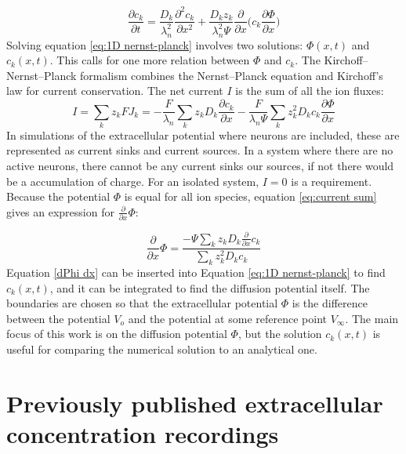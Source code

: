 \documentclass{uiophd}
\begin{document}
\begin{equation}\label{eq:1D nernst-planck}
\frac{\partial c_k}{\partial t}= \frac{D_k}{\lambda_n^2} \frac{\partial^2 c_k}{\partial x^2}+\frac{D_k z_k}{\lambda_n^2 \Psi} \frac{\partial }{\partial x}  \bigg(c_k \frac{\partial \Phi}{\partial x} \bigg)
\end{equation}
Solving equation \ref{eq:1D nernst-planck} involves two solutions: $\Phi (x,t)$ and $c_k(x,t)$. This calls for one more relation between $\Phi$ and $c_k$. The Kirchoff--Nernst--Planck formalism \cite{Halnes2015} \cite{Halnes2016} combines the Nernst--Planck equation and Kirchoff's law for current conservation. 
The net current $I$ is the sum of all the ion fluxes:
\begin{equation}\label{eq:current sum}
I = \sum_{k}z_k FJ_k = -\frac{F}{\lambda_n}\sum_k z_k D_k  \frac{\partial c_k}{ \partial x} - \frac{F}{\lambda_n \Psi}\sum_k z_k^2D_k c_k \frac{\partial \Phi}{\partial x}
\end{equation}
In simulations of the extracellular potential where neurons are included, these are represented as current sinks and current sources. In a system where there are no active neurons, there cannot be any current sinks our sources, if not there would be a accumulation of charge. For an isolated system, $I=0$ is a requirement. Because the potential 
$\Phi$ is equal for all ion species, equation \ref{eq:current sum} gives an  expression for $ \frac{\partial}{\partial x} \Phi$:

\begin{equation}\label{dPhi dx}
\frac{\partial}{\partial x} \Phi = \frac{-\Psi \sum_k z_k D_k \frac{\partial}{\partial x} c_k}{\sum_k z_k^2 D_k c_k}
\end{equation}
Equation \ref{dPhi dx} can be inserted into Equation \ref{eq:1D nernst-planck} to find $c_k(x,t)$, and it can be integrated to find the diffusion potential itself. The boundaries are chosen so that the extracellular potential $\Phi$ is the difference between the potential $V_o$ and the potential at some reference point $V_{\infty}$. The main focus of this work is on the diffusion potential $\Phi$, but the solution $c_k(x,t)$ is useful for comparing the numerical solution to an analytical one.

\section{Previously published extracellular concentration recordings}\label{EC c recordings}
 
\end{document}

